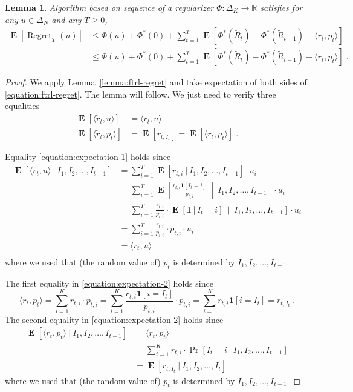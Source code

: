 \documentclass[12pt]{article}
\newtheorem{lemma}{Lemma}
\newcommand{\R}{\mathbb{R}}
\newcommand{\indicator}{\mathbf{1}}
\DeclareMathOperator{\Regret}{Regret}
\DeclareMathOperator{\Exp}{\mathbf{E}}
\begin{document}
\begin{lemma}
\label{lemma:ftrl-expected-regret}
Algorithm based on sequence of a regularizer $\Phi:\Delta_K \to \R$ satisfies
for any $u \in \Delta_N$ and any $T \ge 0$,
\begin{align*}
\Exp[\Regret_T(u)]
& \le \Phi(u) + \Phi^*(0) + \sum_{t=1}^T \Exp\left[\Phi^*(\widetilde R_t) - \Phi^*(\widetilde R_{t-1}) - \langle \widetilde r_t, p_t \rangle \right] \\
& \le \Phi(u) + \Phi^*(0) + \sum_{t=1}^T \Exp\left[\Phi^*(\widetilde R_t) - \Phi^*(\widetilde R_{t-1}) - \langle r_t, p_t \rangle \right] \; .
\end{align*}
\end{lemma}

\begin{proof}
We apply Lemma~\ref{lemma:ftrl-regret} and take expectation of both sides of \eqref{equation:ftrl-regret}.
The lemma will follow. We just need to verify three equalities
\begin{align}
\Exp[\langle \widetilde r_t, u \rangle] & = \langle r_t, u \rangle \label{equation:expectation-1} \\
\Exp[\langle \widetilde r_t, p_t \rangle] & = \Exp[r_{t,I_t}] = \Exp[\langle r_t, p_t \rangle] \label{equation:expectation-2} \; .
\end{align}

Equality \eqref{equation:expectation-1} holds since
\begin{align*}
\Exp[\langle \widetilde r_t, u \rangle ~|~ I_1, I_2, \dots, I_{t-1}]
& = \sum_{i=1}^T \Exp[\widetilde r_{t,i} ~|~ I_1, I_2, \dots, I_{t-1} ] \cdot u_i \\
& = \sum_{i=1}^T \Exp\left[  \frac{r_{t,i} \indicator[I_t=i]}{p_{t,i}} ~\middle|~ I_1, I_2, \dots, I_{t-1} \right] \cdot u_i \\
& = \sum_{i=1}^T \frac{r_{t,i}}{p_{t,i}} \cdot \Exp\left[ \indicator[I_t=i] ~\middle|~ I_1, I_2, \dots, I_{t-1} \right] \cdot u_i \\
& = \sum_{i=1}^T \frac{r_{t,i}}{p_{t,i}} \cdot p_{t,i}  \cdot u_i \\
& = \langle r_t, u \rangle \\
\end{align*}
where we used that (the random value of) $p_t$ is determined by $I_1, I_2, \dots, I_{t-1}$.

The first equality in \eqref{equation:expectation-2} holds since
$$
\langle \widetilde r_t, p_t \rangle
= \sum_{i=1}^K \widetilde r_{t,i} \cdot p_{t,i}
= \sum_{i=1}^K \frac{r_{t,i} \indicator[i=I_t]}{p_{t,i}} \cdot p_{t,i}
= \sum_{i=1}^K r_{t,i} \indicator[i=I_t]
= r_{t,I_t} \; .
$$
The second equality in \eqref{equation:expectation-2} holds since
\begin{align*}
\Exp\left[ \langle r_t, p_t \rangle ~|~ I_1, I_2, \dots, I_{t-1} \right]
& = \langle r_t, p_t \rangle \\
& = \sum_{i=1}^K r_{t,i} \cdot \Pr\left[ I_t = i ~|~ I_1, I_2, \dots, I_{t-1} \right] \\
& = \Exp\left[r_{t,I_t} ~|~ I_1, I_2, \dots, I_t \right]
\end{align*}
where we used that (the random value of) $p_t$ is determined by $I_1, I_2, \dots, I_{t-1}$.
\end{proof}
\end{document}
